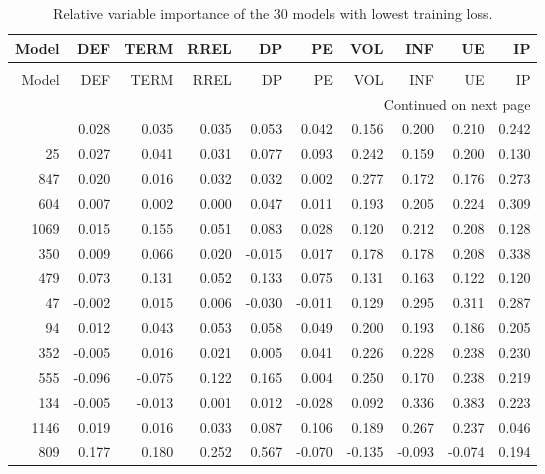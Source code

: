 \begin{longtable}{rrrrrrrrrr}
\caption{Relative variable importance of the 30 models with lowest training loss.}
\label{tab:Importance_lossK_P_30}\\
\toprule
 Model &    DEF &   TERM &   RREL &     DP &     PE &    VOL &    INF &     UE &    IP \\
\midrule
\endfirsthead
\caption[]{Relative variable importance of the 30 models with lowest training loss.} \\
\toprule
 Model &    DEF &   TERM &   RREL &     DP &     PE &    VOL &    INF &     UE &    IP \\
\midrule
\endhead
\midrule
\multicolumn{10}{r}{{Continued on next page}} \\
\midrule
\endfoot

\bottomrule
\endlastfoot
   558 &  0.028 &  0.035 &  0.035 &  0.053 &  0.042 &  0.156 &  0.200 &  0.210 & 0.242 \\
    25 &  0.027 &  0.041 &  0.031 &  0.077 &  0.093 &  0.242 &  0.159 &  0.200 & 0.130 \\
   847 &  0.020 &  0.016 &  0.032 &  0.032 &  0.002 &  0.277 &  0.172 &  0.176 & 0.273 \\
   604 &  0.007 &  0.002 &  0.000 &  0.047 &  0.011 &  0.193 &  0.205 &  0.224 & 0.309 \\
  1069 &  0.015 &  0.155 &  0.051 &  0.083 &  0.028 &  0.120 &  0.212 &  0.208 & 0.128 \\
   350 &  0.009 &  0.066 &  0.020 & -0.015 &  0.017 &  0.178 &  0.178 &  0.208 & 0.338 \\
   479 &  0.073 &  0.131 &  0.052 &  0.133 &  0.075 &  0.131 &  0.163 &  0.122 & 0.120 \\
    47 & -0.002 &  0.015 &  0.006 & -0.030 & -0.011 &  0.129 &  0.295 &  0.311 & 0.287 \\
    94 &  0.012 &  0.043 &  0.053 &  0.058 &  0.049 &  0.200 &  0.193 &  0.186 & 0.205 \\
   352 & -0.005 &  0.016 &  0.021 &  0.005 &  0.041 &  0.226 &  0.228 &  0.238 & 0.230 \\
   555 & -0.096 & -0.075 &  0.122 &  0.165 &  0.004 &  0.250 &  0.170 &  0.238 & 0.219 \\
   134 & -0.005 & -0.013 &  0.001 &  0.012 & -0.028 &  0.092 &  0.336 &  0.383 & 0.223 \\
  1146 &  0.019 &  0.016 &  0.033 &  0.087 &  0.106 &  0.189 &  0.267 &  0.237 & 0.046 \\
   809 &  0.177 &  0.180 &  0.252 &  0.567 & -0.070 & -0.135 & -0.093 & -0.074 & 0.194 \\

\end{longtable}
